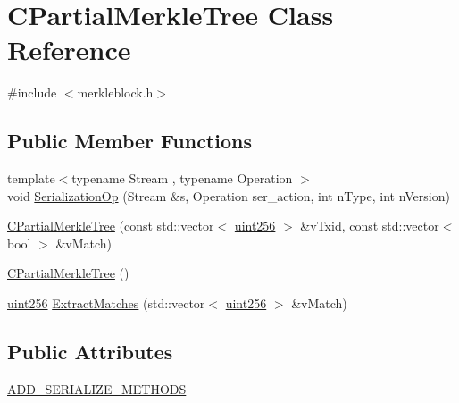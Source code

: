 \hypertarget{class_c_partial_merkle_tree}{}\section{C\+Partial\+Merkle\+Tree Class Reference}
\label{class_c_partial_merkle_tree}


{\ttfamily \#include $<$merkleblock.\+h$>$}

\subsection*{Public Member Functions}
\begin{DoxyCompactItemize}
\item 
{\footnotesize template$<$typename Stream , typename Operation $>$ }\\void \hyperlink{class_c_partial_merkle_tree_a44903b156e6c77f3ef977324b24daf1f}{Serialization\+Op} (Stream \&s, Operation ser\+\_\+action, int n\+Type, int n\+Version)
\item 
\hyperlink{class_c_partial_merkle_tree_a0656767dc0d8f3d603c54e5be21d3890}{C\+Partial\+Merkle\+Tree} (const std\+::vector$<$ \hyperlink{classuint256}{uint256} $>$ \&v\+Txid, const std\+::vector$<$ bool $>$ \&v\+Match)
\item 
\hyperlink{class_c_partial_merkle_tree_aad4948ace869c92614310846f9d9980d}{C\+Partial\+Merkle\+Tree} ()
\item 
\hyperlink{classuint256}{uint256} \hyperlink{class_c_partial_merkle_tree_a28c3456d1159b33b6c2689ac88eb56ad}{Extract\+Matches} (std\+::vector$<$ \hyperlink{classuint256}{uint256} $>$ \&v\+Match)
\end{DoxyCompactItemize}
\subsection*{Public Attributes}
\begin{DoxyCompactItemize}
\item 
\hyperlink{class_c_partial_merkle_tree_ae218db8103edb6672fe0d642535c7490}{A\+D\+D\+\_\+\+S\+E\+R\+I\+A\+L\+I\+Z\+E\+\_\+\+M\+E\+T\+H\+O\+D\+S}
\end{DoxyCompactItemize}
